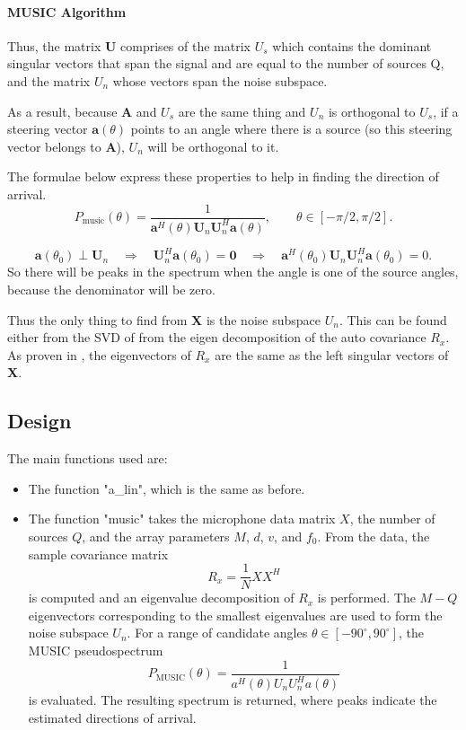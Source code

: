 \paragraph{MUSIC Algorithm}

Thus, the matrix \textbf{U} comprises of the matrix \textbf{$U_s$} which contains the dominant singular vectors that span the signal and are equal to the number of sources Q, and the matrix \textbf{$U_n$} whose vectors span the noise subspace.

As a result, because \textbf{A} and \textbf{$U_s$} are the same thing and \textbf{$U_n$} is orthogonal to \textbf{$U_s$}, if a steering vector $\mathbf{a}(\theta)$ points to an angle where there is a source (so this steering vector belongs to \textbf{A}), \textbf{$U_n$} will be orthogonal to it.


The formulae below express these properties to help in finding the direction of arrival.
$$
P_{\text{music}}(\theta) = \frac{1}{\mathbf{a}^H(\theta)\mathbf{U}_n\mathbf{U}_n^H\mathbf{a}(\theta)}, \qquad \theta \in [-\pi/2, \pi/2].
$$

$$
\mathbf{a}(\theta_0) \perp \mathbf{U}_n \quad \Rightarrow \quad \mathbf{U}_n^H\mathbf{a}(\theta_0) = \mathbf{0} \quad \Rightarrow \quad \mathbf{a}^H(\theta_0)\mathbf{U}_n\mathbf{U}_n^H\mathbf{a}(\theta_0) = 0.
$$
So there will be peaks in the spectrum when the angle is one of the source angles, because the denominator will be zero.

Thus the only thing to find from \textbf{X} is the noise subspace \textbf{$U_n$}. This can be found either from the SVD of from the eigen decomposition of the auto covariance $R_x$. As proven in \cite{IP3Man}, the eigenvectors of $R_x$ are the same as the left singular vectors of \textbf{X}.


\subsection{Design}
The main functions used are:
\begin{itemize}
    \item The function "a\_lin", which is the same as before.

    \item The function "music" takes the microphone data matrix \(X\), the number of sources \(Q\), and the array parameters \(M\), \(d\), \(v\), and \(f_0\). From the data, the sample covariance matrix
    \[
    R_x = \frac{1}{N} X X^H
    \]
    is computed and an eigenvalue decomposition of \(R_x\) is performed. The \(M-Q\) eigenvectors corresponding to the smallest eigenvalues are used to form the noise subspace \(U_n\). For a range of candidate angles \(\theta \in [-90^\circ,90^\circ]\), the MUSIC pseudospectrum
    \[
    P_{\text{MUSIC}}(\theta) = \frac{1}{a^H(\theta) U_n U_n^H a(\theta)}
    \]
    is evaluated. The resulting spectrum is returned, where peaks indicate the estimated directions of arrival.

\end{itemize}


